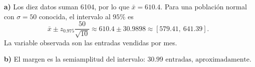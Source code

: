 \textbf{a)} Los diez datos suman 6104, por lo que
$\bar x=610.4$. Para una población normal con $\sigma=50$
conocida, el intervalo al $95\%$ es
\[
\bar x\pm z_{0.975}\frac{50}{\sqrt{10}}
\approx610.4\pm30.9898
\approx\boxed{[579.41,\ 641.39]}.
\]
La variable observada son las entradas vendidas por mes.

\textbf{b)} El margen es la semiamplitud del intervalo:
$\boxed{30.99\text{ entradas, aproximadamente}}$.
